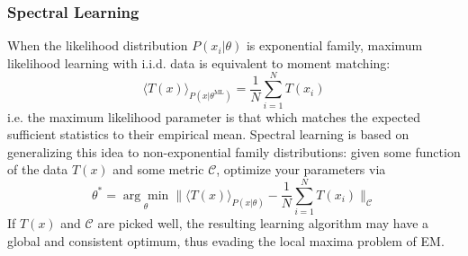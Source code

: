 \documentclass[a4paper]{article}
\begin{document}
\subsubsection{Spectral Learning} \label{spectral learning}
When the likelihood distribution $P(x_i|\theta)$ is exponential family, maximum likelihood learning with i.i.d. data is equivalent to moment matching:
\[ \langle T(x) \rangle_{P(x|\theta^\textrm{ML})} = \frac{1}{N}\sum_{i=1}^N T(x_i) \]
i.e. the maximum likelihood parameter is that which matches the expected sufficient statistics to their empirical mean. Spectral learning is based on generalizing this idea to non-exponential family distributions: given some function of the data $T(x)$ and some metric $\mathcal{C}$, optimize your parameters via
\[ \theta^* = \underset{\theta}{\arg\min} \| \langle T(x) \rangle_{P(x|\theta)} - \frac{1}{N}\sum_{i=1}^N T(x_i) \|_\mathcal{C} \]
If $T(x)$ and $\mathcal{C}$ are picked well, the resulting learning algorithm may have a global and consistent optimum, thus evading the local maxima problem of EM.
\end{document}
